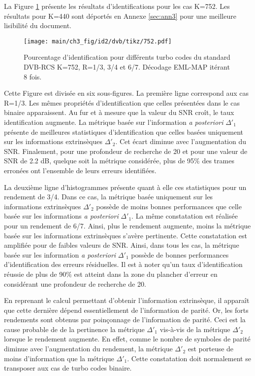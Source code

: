 La Figure \ref{fig:dvb752} présente les résultats d'identifications pour les cas K=752. Les résultats pour K=440 sont 
déportés en Annexe \ref{sec:ann3} pour une meilleure lisibilité du document.
\begin{figure}[!h]
	\centering
	\hspace*{-1cm}
	\texttt{[image: main/ch3\_fig/id2/dvb/tikz/752.pdf]}
	\caption{Pourcentage d'identification pour différents turbo codes du standard DVB-RCS K=752, R=1/3, 3/4 et 6/7.
	Décodage EML-MAP itérant 8 fois. \label{fig:dvb752}}
\end{figure}
Cette Figure est divisée en six sous-figures. La première ligne correspond aux cas R=1/3. Les mêmes propriétés 
d'identification que celles présentées dans le cas binaire apparaissent. Au fur et à mesure que la valeur du SNR croît, le 
taux identification augmente. La métrique basée sur l'information \textit{a posteriori} $\Delta'_1$ présente de meilleures statistiques
d'identification que celles basées uniquement sur les informations extrinsèques $\Delta'_2$. Cet écart diminue avec l'augmentation du SNR.
Finalement, pour une profondeur de recherche de 20 et pour une valeur de SNR de 2.2 dB, quelque soit la métrique considérée, 
plus de 95\% des trames erronées ont l'ensemble de leurs erreurs identifiées.

La deuxième ligne d'histogrammes présente quant à elle ces statistiques  pour un rendement de 3/4. Dans ce cas, la 
métrique basée uniquement sur les informations extrinsèques $\Delta'_2$ possède de moins bonnes performances que celle basée sur les 
informations \textit{a posteriori} $\Delta'_1$. La même constatation est réalisée pour un rendement de 6/7. Ainsi, plus le rendement 
augmente, moins la métrique basée sur les informations extrinsèques s'avère pertinente. Cette constatation est amplifiée pour 
de faibles valeurs de SNR. Ainsi, dans tous les cas, la métrique basée sur les information \textit{a posteriori} $\Delta'_1$
possède de bonnes performances d'identification des erreurs résiduelles. Il est à noter qu'un taux d'identification réussie de plus de 
90\% est atteint dans la zone du plancher d'erreur en considérant une profondeur de recherche de 20. 

En reprenant le calcul permettant d'obtenir l'information extrinsèque, il apparaît que cette dernière dépend 
essentiellement de l'information de parité. Or, les forts rendements sont obtenus par poinçonnage 
de l'information de parité. Ceci est la cause probable de de la pertinence la métrique $\Delta'_1$ vis-à-vis de la
métrique $\Delta'_2$ lorsque le rendement augmente. En effet, comme le nombre de symboles de parité diminue avec l'augmentation 
du rendement, la métrique $\Delta'_2$ est porteuse de moins d'information que la métrique $\Delta'_1$. Cette constatation 
doit normalement se transposer aux cas de turbo codes binaire.

